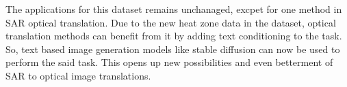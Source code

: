 The applications for this dataset remains unchanaged, excpet for one method in SAR optical translation. Due to the new heat zone data in the dataset, optical translation methods can benefit from it by adding text conditioning to the task. So, text based image generation models like stable diffusion can now be used to perform the said task. This opens up new possibilities and even betterment of SAR to optical image translations.
